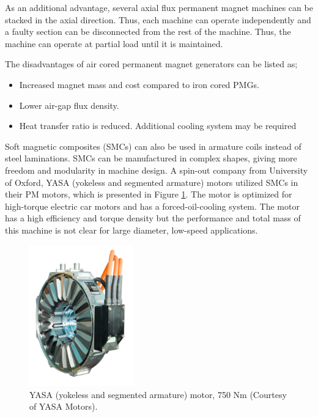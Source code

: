 \documentclass[a4paper, 11pt]{article} %
\begin{document}
As an additional advantage, several axial flux permanent magnet machines can be stacked in the axial direction. Thus, each machine can operate independently and a faulty section can be disconnected from the rest of the machine. Thus, the machine can operate at partial load until it is maintained. 

The disadvantages of air cored permanent magnet generators can be listed as;

\begin{itemize}
	\item Increased magnet mass and cost compared to iron cored PMGs.
	\item Lower air-gap flux density.
	\item Heat transfer ratio is reduced. Additional cooling system may be required
\end{itemize}

Soft magnetic composites (SMCs) can also be used in armature coils instead of steel laminations. SMCs can be manufactured in complex shapes, giving more freedom and modularity in machine design. A spin-out company from University of Oxford, YASA (yokeless and segmented armature) motors utilized SMCs in their PM motors, which is presented in Figure \ref{yasa_motor}. The motor is optimized for high-torque electric car motors and has a forced-oil-cooling system. The motor has a high efficiency and torque density but the performance and total mass of this machine is not clear for large diameter, low-speed applications.


  \begin{figure}[t]
    \centering
    \includegraphics[width=0.4\textwidth]{yasa_motor}
    \caption{YASA (yokeless and segmented armature) motor, 750 Nm (Courtesy of YASA Motors).} 
    \label{yasa_motor}
  \end{figure}
\end{document}
